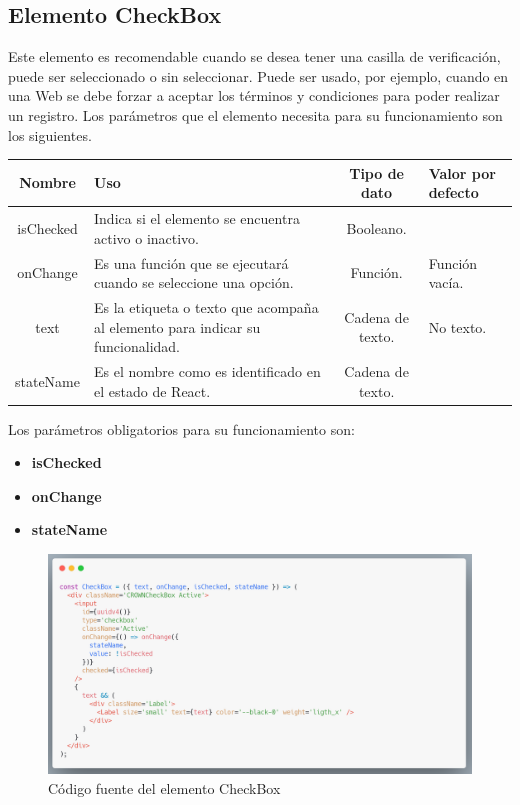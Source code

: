 \subsection{Elemento CheckBox}
Este elemento es recomendable cuando se desea tener una casilla de verificación, puede ser seleccionado o sin seleccionar. Puede ser usado, por ejemplo, cuando en una Web se debe forzar a aceptar los términos y condiciones para poder realizar un registro.
Los parámetros que el elemento necesita para su funcionamiento son los siguientes.
\newline
    \newline
    \begin{center}
     \begin{tabular}{ | c |  p{5cm}  | c | p{3cm} |} 
     \hline
     \textbf{Nombre} &  \textbf{Uso} &  \textbf{ Tipo de dato} &  \textbf{Valor por defecto}\\ [0.5ex] 
     \hline\hline
      isChecked & Indica si el elemento se encuentra activo o inactivo.  &  Booleano.  & \\  [2.5ex] 
     \hline
      onChange &  Es una función que se ejecutará cuando se seleccione una opción.  & Función.   &  Función vacía.\\  [2.5ex] 
     \hline
      text &  Es la etiqueta o texto que acompaña al elemento para indicar su funcionalidad. &  Cadena de texto.  & No texto. \\  [2.5ex] 
     \hline
      stateName & Es el nombre como es identificado en el estado de React.  &  Cadena de texto.  &  \\  [2.5ex] 
     \hline
    \end{tabular}
    \end{center}
    \newline
                \newline
Los parámetros obligatorios para su funcionamiento son:
\begin{itemize}
\item \textbf{isChecked} 
\item \textbf{onChange} 
\item \textbf{stateName} 
\end{itemize}
\newline
    \newline
    \begin{figure}[H]
    \centering
    \includegraphics[width=1\textwidth]{./Imagenes/8.34.png}
    \caption[Código fuente del elemento CheckBox]{Código fuente del elemento CheckBox}
    \end{figure}
\clearpage



